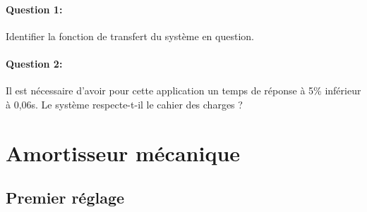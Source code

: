 \paragraph{Question 1:} Identifier la fonction de transfert du système en question.

\paragraph{Question 2:} Il est nécessaire d'avoir pour cette application un temps de réponse à 5\% inférieur à 0,06s. Le système respecte-t-il le cahier des charges ?

\newpage

\section{Amortisseur mécanique}


\subsection{Premier réglage}

